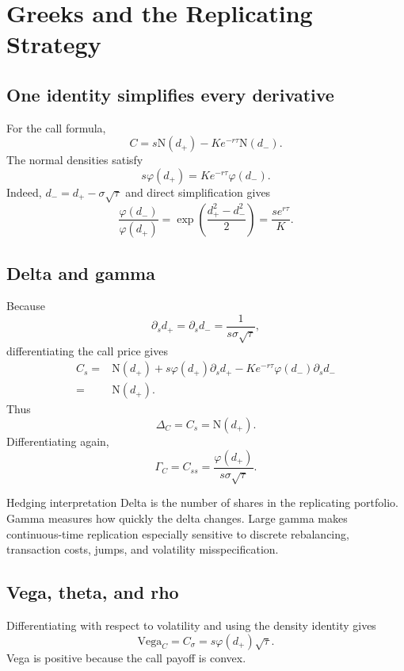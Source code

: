 \documentclass[10pt]{article}
\newcommand{\1}{\mathbf 1}
\newcommand{\Ncdf}{\mathrm N}
\newcommand{\phiN}{\varphi}
\theoremstyle{definition}
\begin{document}
\section{Greeks and the Replicating Strategy}

\subsection{One identity simplifies every derivative}

For the call formula,
\[
C=s\Ncdf(d_+)-Ke^{-r\tau}\Ncdf(d_-).
\]
The normal densities satisfy
\[
\boxed{
s\phiN(d_+)=Ke^{-r\tau}\phiN(d_-).}
\]
Indeed, \(d_-=d_+-\sigma\sqrt{\tau}\) and direct simplification gives
\[
\frac{\phiN(d_-)}{\phiN(d_+)}
=\exp\left(\frac{d_+^2-d_-^2}{2}\right)
=\frac{se^{r\tau}}{K}.
\]

\subsection{Delta and gamma}

Because
\[
\partial_s d_+=\partial_s d_-
=\frac{1}{s\sigma\sqrt{\tau}},
\]
differentiating the call price gives
\[
\begin{aligned}
C_s
={}&\Ncdf(d_+)
+s\phiN(d_+)\partial_sd_+
-Ke^{-r\tau}\phiN(d_-)\partial_sd_-\\
={}&\Ncdf(d_+).
\end{aligned}
\]
Thus
\[
\boxed{\Delta_C=C_s=\Ncdf(d_+).}
\]
Differentiating again,
\[
\boxed{
\Gamma_C=C_{ss}
=\frac{\phiN(d_+)}{s\sigma\sqrt{\tau}}.}
\]

\begin{keyidea}{Hedging interpretation}
Delta is the number of shares in the replicating portfolio. Gamma measures
how quickly the delta changes. Large gamma makes continuous-time replication
especially sensitive to discrete rebalancing, transaction costs, jumps, and
volatility misspecification.
\end{keyidea}

\subsection{Vega, theta, and rho}

Differentiating with respect to volatility and using the density identity
gives
\[
\boxed{
\mathrm{Vega}_C=C_\sigma
=s\phiN(d_+)\sqrt{\tau}.}
\]
Vega is positive because the call payoff is convex.
\end{document}
